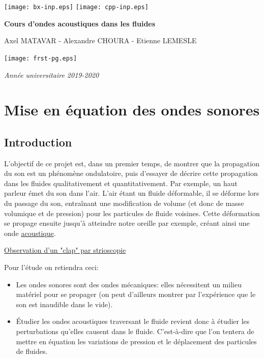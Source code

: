 \documentclass[a4paper, 12pt]{article}
\begin{document}
\begin{titlepage}
{\texttt{[image: bx-inp.eps]}}
{\texttt{[image: cpp-inp.eps]}}
\begin{center}
 \Huge{\textbf{Cours d'ondes acoustiques dans les fluides}}
\end{center}
\begin{center}
 \normalsize{Axel MATAVAR - Alexandre CHOURA - Etienne LEMESLE}
\end{center}
\begin{center}
 {\texttt{[image: frst-pg.eps]}}
\end{center}
\begin{center}
 \Large{\textit{Ann\'ee universitaire 2019-2020}}
\end{center}
\end{titlepage}

\tableofcontents
\newpage

\section{Mise en équation des ondes sonores}

\subsection{Introduction}

L'objectif de ce projet est, dans un premier temps, de montrer que la propagation du son est un phénomène ondulatoire, puis d'essayer de décrire cette propagation dans les fluides qualitativement et quantitativement.\newline \newline
Par exemple, un haut parleur émet du son dans l'air. L'air étant un fluide déformable, il se déforme lors du passage du son, entraînant une modification de volume (et donc de masse volumique et de pression) pour les particules de fluide voisines. Cette déformation se propage ensuite jusqu'à atteindre notre oreille par exemple, créant ainsi une onde \underline{acoustique}.
\begin{flushright}
{\textcolor{blue}{\href{https://youtu.be/px3oVGXr4mo?t=09}{Observation d'un "clap" par strioscopie}}}
\end{flushright}
Pour l'étude on retiendra ceci:
\begin{itemize}
\item Les ondes sonores sont des ondes mécaniques: elles nécessitent un milieu matériel pour se propager (on peut d'ailleurs montrer par l'expérience que le son est inaudible dans le vide).

\item Étudier les ondes acoustiques traversant le fluide revient donc à étudier les perturbations qu'elles causent dans le fluide. C'est-à-dire que l'on tentera de mettre en équation les variations de pression et le déplacement des particules de fluides.
\end{itemize}
\end{document}

